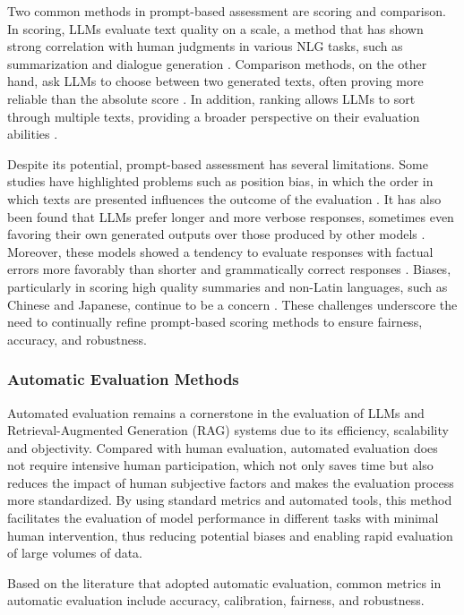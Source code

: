 Two common methods in prompt-based assessment are scoring and comparison. In scoring, LLMs evaluate text quality on a scale, a method that has shown strong correlation with human judgments in various NLG tasks, such as summarization and dialogue generation \cite{chiang2023can}. Comparison methods, on the other hand, ask LLMs to choose between two generated texts, often proving more reliable than the absolute score \cite{luo2023chatgpt}. In addition, ranking allows LLMs to sort through multiple texts, providing a broader perspective on their evaluation abilities \cite{ji2023exploring}.

Despite its potential, prompt-based assessment has several limitations. Some studies have highlighted problems such as position bias, in which the order in which texts are presented influences the outcome of the evaluation \cite{wang2023large}. It has also been found that LLMs prefer longer and more verbose responses, sometimes even favoring their own generated outputs over those produced by other models \cite{zheng2024judging, liu2023g}. Moreover, these models showed a tendency to evaluate responses with factual errors more favorably than shorter and grammatically correct responses \cite{wu2023style}. Biases, particularly in scoring high quality summaries and non-Latin languages, such as Chinese and Japanese, continue to be a concern \cite{hada2023large}. These challenges underscore the need to continually refine prompt-based scoring methods to ensure fairness, accuracy, and robustness.

\subsubsection{Automatic Evaluation Methods}

Automated evaluation remains a cornerstone in the evaluation of LLMs and Retrieval-Augmented Generation (RAG) systems due to its efficiency, scalability and objectivity. Compared with human evaluation, automated evaluation does not require intensive human participation, which not only saves time but also reduces the impact of human subjective factors and makes the evaluation process more standardized. By using standard metrics and automated tools, this method facilitates the evaluation of model performance in different tasks with minimal human intervention, thus reducing potential biases and enabling rapid evaluation of large volumes of data.

Based on the literature that adopted automatic evaluation, common metrics in automatic evaluation include accuracy, calibration, fairness, and robustness.

